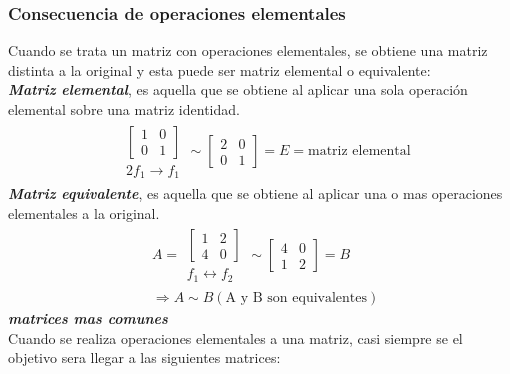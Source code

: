 \subsubsection*{Consecuencia de operaciones elementales}
Cuando se trata un matriz con operaciones elementales, se obtiene una matriz distinta a la original y esta puede ser matriz elemental o equivalente: \\
\textbf{\textit{Matriz elemental}}, es aquella que se obtiene al aplicar una sola operación elemental sobre una matriz identidad.
\begin{align*}
	&\begin{array} {c}
		\begin{bmatrix}
			1&0\\
			0&1
		\end{bmatrix}\\
		2f_1\rightarrow f_1
	\end{array}\sim\begin{bmatrix}
		2&0\\
		0&1
	\end{bmatrix}=E=\text{matriz elemental}
\end{align*}
\textbf{\textit{Matriz equivalente}}, es aquella que se obtiene al aplicar una o mas operaciones elementales a la original.
\begin{align*}
	&A=\begin{array} {c}
		\begin{bmatrix}
			1&2\\
			4&0
		\end{bmatrix}\\
		f_1\leftrightarrow f_2
	\end{array}\sim\begin{bmatrix}
		4&0\\
		1&2
	\end{bmatrix}=B\\
	&\Rightarrow A\sim B (\text{A  y B son equivalentes})
\end{align*}
\textbf{\textit{matrices mas comunes}} \\
Cuando se realiza operaciones elementales a una matriz, casi siempre se el objetivo sera llegar a las siguientes matrices:
